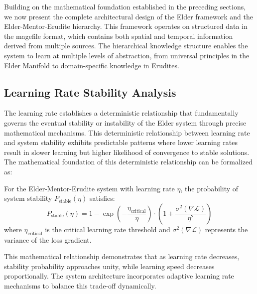Building on the mathematical foundation established in the preceding sections, we now present the complete architectural design of the Elder framework and the Elder-Mentor-Erudite hierarchy. This framework operates on structured data in the magefile format, which contains both spatial and temporal information derived from multiple sources. The hierarchical knowledge structure enables the system to learn at multiple levels of abstraction, from universal principles in the Elder Manifold to domain-specific knowledge in Erudites.

\subsection{Learning Rate Stability Analysis}

The learning rate establishes a deterministic relationship that fundamentally governs the eventual stability or instability of the Elder system through precise mathematical mechanisms. This deterministic relationship between learning rate and system stability exhibits predictable patterns where lower learning rates result in slower learning but higher likelihood of convergence to stable solutions. The mathematical foundation of this deterministic relationship can be formalized as:

\begin{theorem}
For the Elder-Mentor-Erudite system with learning rate $\eta$, the probability of system stability $P_{\text{stable}}(\eta)$ satisfies:
\begin{equation}
P_{\text{stable}}(\eta) = 1 - \exp\left(-\frac{\eta_{\text{critical}}}{\eta}\right) \cdot \left(1 + \frac{\sigma^2(\nabla \mathcal{L})}{\eta^2}\right)
\end{equation}
where $\eta_{\text{critical}}$ is the critical learning rate threshold and $\sigma^2(\nabla \mathcal{L})$ represents the variance of the loss gradient.
\end{theorem}

This mathematical relationship demonstrates that as learning rate decreases, stability probability approaches unity, while learning speed decreases proportionally. The system architecture incorporates adaptive learning rate mechanisms to balance this trade-off dynamically.

